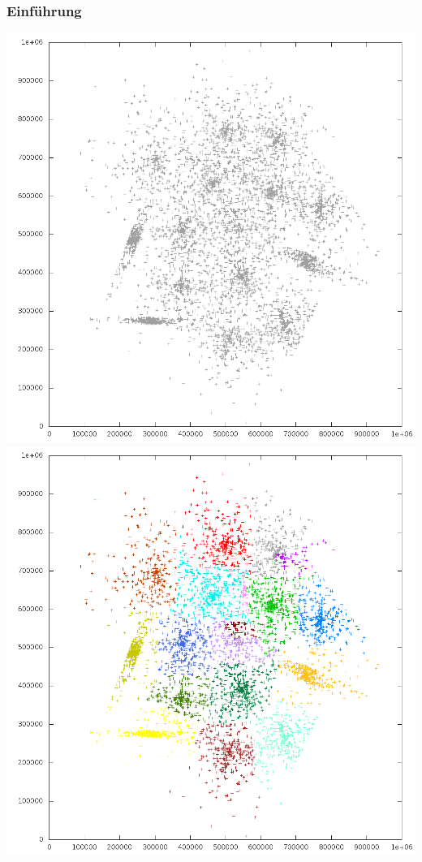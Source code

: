 \documentclass[10pt]{beamer}
\begin{document}
\begin{frame}
	\frametitle{Einf\"uhrung}
	\includegraphics[scale=0.22, keepaspectratio]{../output/pics/s4_black.png}
	\includegraphics[scale=0.22, keepaspectratio]{../output/pics/s4_colored.png}
\end{frame}
\end{document}
